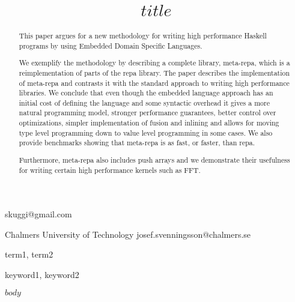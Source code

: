 \documentclass[preprint]{sigplanconf}
\begin{document}
\copyrightdata{[to be supplied]} 


\title{$title$}


           {}
           {skuggi@gmail.com}

           {Chalmers University of Technology}
           {josef.svenningsson@chalmers.se}

\maketitle

\begin{abstract}
This paper argues for a new methodology for writing high performance
Haskell programs by using Embedded Domain Specific Languages. 

We exemplify the methodology by describing a complete library,
meta-repa, which is a reimplementation of parts of the repa
library. The paper describes the implementation of meta-repa and
contrasts it with the standard approach to writing high performance
libraries. We conclude that even though the embedded language approach
has an initial cost of defining the language and some syntactic
overhead it gives a more natural programming model, stronger
performance guarantees, better control over optimizations, simpler
implementation of fusion and inlining and allows for moving type level
programming down to value level programming in some cases. We also
provide benchmarks showing that meta-repa is as fast, or faster, than
repa.

Furthermore, meta-repa also includes push arrays and we demonstrate
their usefulness for writing certain high performance kernels such as
FFT.
\end{abstract}


\terms
term1, term2

\keywords
keyword1, keyword2

$body$
\end{document}
